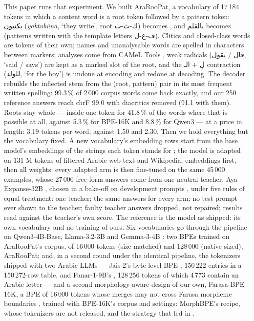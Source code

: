 This paper runs that experiment. We built AraRooPat, a vocabulary of 17\,184 tokens in which a content word is a root
token followed by a pattern token: \textarabic{يكتبون} (\textit{yaktubūna}, `they write', root \textarabic{ك-ت-ب})
becomes  , and \textarabic{بالقلم} becomes  
  (patterns written with the template letters \textarabic{ف-ع-ل}). Clitics and
closed-class words are tokens of their own; names and unanalysable words are spelled in characters between markers;
analyses come from CAMeL Tools \citep{obeid-etal-2020-camel}, weak radicals (\textarabic{قال} / \textarabic{يقول}, `said
/ says') are kept as a marked slot of the root, and the \textarabic{لِ} + \textarabic{الـ} contraction
(\textarabic{للولد}, `for the boy') is undone at encoding and redone at decoding. The decoder rebuilds the inflected
stem from the (root, pattern) pair in its most frequent written spelling: 99.3\,\% of 2\,000 corpus words come back
exactly, and our 250 reference answers reach chrF 99.0 with diacritics removed (91.1 with them). Roots stay whole ---
inside one token for 41.8\,\% of the words where that is possible at all, against 5.3\,\% for BPE-16K and 8.8\,\% for
Qwen3 --- at a price in length: 3.19 tokens per word, against 1.50 and 2.30. Then we hold everything but the vocabulary
fixed. A new vocabulary's embedding rows start from the base model's embeddings of the strings each token stands for
\citep{minixhofer-etal-2022-wechsel,dobler-de-melo-2023-focus,mundra2024empirical}; the model is adapted on 131 M tokens
of filtered Arabic web text and Wikipedia, embeddings first, then all weights; every adapted arm is then fine-tuned on
the same 45\,000 examples, whose 27\,000 free-form answers come from one neutral teacher, Aya-Expanse-32B
\citep{dang2024ayaexpanse}, chosen in a bake-off on development prompts \citep[sequence-level
distillation;][]{kim-rush-2016-sequence}, under five rules of equal treatment: one teacher; the same answers for every
arm; no test prompt ever shown to the teacher; faulty teacher answers dropped, not repaired; results read against the
teacher's own score. The reference is the model as shipped: its own vocabulary and no training of ours. Six vocabularies
go through the pipeline on Qwen3-4B-Base, Llama-3.2-3B and Gemma-3-4B
\citep{yang2025qwen3,grattafiori2024llama3,gemmateam2025gemma3}: two BPEs trained on AraRooPat's corpus, of 16\,000
tokens (size-matched) and 128\,000 (native-sized); AraRooPat; and, in a second round under the identical pipeline, the
tokenizers shipped with two Arabic LLMs --- Jais-2's byte-level BPE \citep{anwar2026jais2}, 150\,222 entries in a
150\,272-row table, and Fanar-1-9B's \citep{fanarteam2025fanar}, 128\,256 tokens of which 4\,773 contain an Arabic
letter --- and a second morphology-aware design of our own, Farasa-BPE-16K, a BPE of 16\,000 tokens whose merges may not
cross Farasa morpheme boundaries \citep{abdelali-etal-2016-farasa}, trained with BPE-16K's corpus and settings:
MorphBPE's recipe, whose tokenizers are not released, and the strategy that led in \citet{alrefaie2024exploring}.

